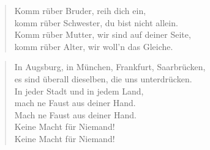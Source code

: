 \documentclass[9pt,a4paper,oneside, onecolumn]{article}
\begin{document}
\begin{verse}
Komm rüber Bruder, reih dich ein,\\
komm rüber Schwester, du bist nicht allein.\\
Komm rüber Mutter, wir sind auf deiner Seite,\\
komm rüber Alter, wir woll'n das Gleiche.\\
\end{verse}

\begin{verse}
In Augsburg, in München, Frankfurt, Saarbrücken,\\
es sind überall dieselben, die uns unterdrücken.\\
In jeder Stadt und in jedem Land,\\
mach ne Faust aus deiner Hand.\\
Mach ne Faust aus deiner Hand.\\
Keine Macht für Niemand!\\
Keine Macht für Niemand! \\
\end{verse}
\end{document}
